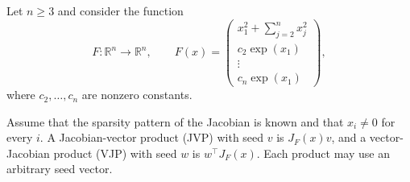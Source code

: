 
Let $n\geq 3$ and consider the function
\[
    F:\mathbb{R}^n\to\mathbb{R}^n,
    \qquad
    F(x)=
    \begin{pmatrix}
        x_1^2+\displaystyle\sum_{j=2}^n x_j^2\\
        c_2\exp(x_1)\\
        \vdots\\
        c_n\exp(x_1)
    \end{pmatrix},
\]
where $c_2,\ldots,c_n$ are nonzero constants.

Assume that the sparsity pattern of the Jacobian is known and that
$x_i\neq 0$ for every $i$. A Jacobian-vector product (JVP) with seed $v$ is
$J_F(x)v$, and a vector-Jacobian product (VJP) with seed $w$ is
$w^\top J_F(x)$. Each product may use an arbitrary seed vector.

